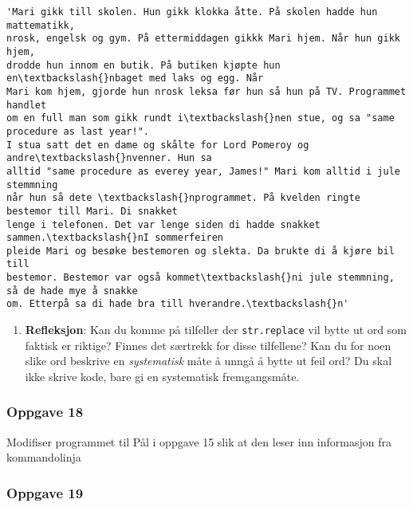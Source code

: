 \documentclass[11pt]{article}
\makeatletter
\providecommand{\tightlist}{%
      \setlength{\itemsep}{0pt}\setlength{\parskip}{0pt}}
\newcommand{\boxspacing}{\kern\kvtcb@left@rule\kern\kvtcb@boxsep}
\newcommand{\prompt}[4]{
        \ttfamily\llap{{\color{#2}[#3]:\hspace{3pt}#4}}\vspace{-\baselineskip}
    }
\makeatother
\begin{document}
            \begin{tcolorbox}[breakable, size=fbox, boxrule=.5pt, pad at break*=1mm, opacityfill=0]
\prompt{Out}{outcolor}{22}{\boxspacing}
\begin{Verbatim}[commandchars=\\\{\}]
'Mari gikk till skolen. Hun gikk klokka åtte. På skolen hadde hun mattematikk,
nrosk, engelsk og gym. På ettermiddagen gikkk Mari hjem. Når hun gikk hjem,
drodde hun innom en butik. På butiken kjøpte hun en\textbackslash{}nbaget med laks og egg. Når
Mari kom hjem, gjorde hun nrosk leksa før hun så hun på TV. Programmet handlet
om en full man som gikk rundt i\textbackslash{}nen stue, og sa "same procedure as last year!".
I stua satt det en dame og skålte for Lord Pomeroy og andre\textbackslash{}nvenner. Hun sa
alltid "same procedure as everey year, James!" Mari kom alltid i jule stemmning
når hun så dete \textbackslash{}nprogrammet. På kvelden ringte bestemor till Mari. Di snakket
lenge i telefonen. Det var lenge siden di hadde snakket sammen.\textbackslash{}nI sommerfeiren
pleide Mari og besøke bestemoren og slekta. Da brukte di å kjøre bil till
bestemor. Bestemor var også kommet\textbackslash{}ni jule stemmning, så de hade mye å snakke
om. Etterpå sa di hade bra till hverandre.\textbackslash{}n'
\end{Verbatim}
\end{tcolorbox}
        
    \begin{enumerate}
\def\labelenumi{\alph{enumi})}
\setcounter{enumi}{2}
\tightlist
\item
  \textbf{Refleksjon}: Kan du komme på tilfeller der
  \texttt{str.replace} vil bytte ut ord som faktisk er riktige? Finnes
  det særtrekk for disse tilfellene? Kan du for noen slike ord beskrive
  en \emph{systematisk} måte å unngå å bytte ut feil ord? Du skal ikke
  skrive kode, bare gi en systematisk fremgangsmåte.
\end{enumerate}

    

    \hypertarget{oppgave-18}{%
\subsubsection{Oppgave 18}\label{oppgave-18}}

Modifiser programmet til Pål i oppgave 15 slik at den leser inn
informasjon fra kommandolinja

    \hypertarget{oppgave-19}{%
\subsubsection{Oppgave 19}\label{oppgave-19}}
\end{document}
